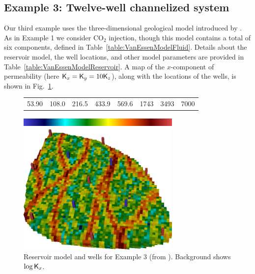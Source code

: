 \documentclass[twocolumn,numbook]{svjour3}          %
\begin{document}
\subsection{Example 3: Twelve-well channelized system}


Our third example uses the three-dimensional geological model introduced by
\cite{VanEssen}. As in Example 1 we consider CO$_2$ injection, though this model
contains a total of six components, defined in
Table~\ref{table:VanEssenModelFluid}. Details about the reservoir model, the well locations, and other model
parameters are provided in Table~\ref{table:VanEssenModelReservoir}.  A map of
the $x$-component of permeability (here $\mathsf{K}_x = \mathsf{K}_y = 10\mathsf{K}_z$), along with the
locations of the wells, is shown in Fig.~\ref{fig:VanEssenModelPermeabilityAndWells}.


\begin{figure}[ht]
     \begin{center}
      \begin{tabular}{cccccccc}
      53.90 & 108.0 & 216.5 & 433.9 & 569.6 & 1743 & 3493 & 7000 
      \end{tabular}
       \includegraphics[width=8cm,height=0.5cm]{VanEssenModelPermeabilityMapColorBar.png}
                                                            
       \medskip
       
       \includegraphics[width=8cm]{VanEssenModelPermeabilityMapConstant.png}%
     \end{center}
     \caption{Reservoir model and wells for Example 3 (from \cite{VanEssen}). Background shows $\log \mathsf{K}_x$.}
  \label{fig:VanEssenModelPermeabilityAndWells}
\end{figure}
\end{document}
